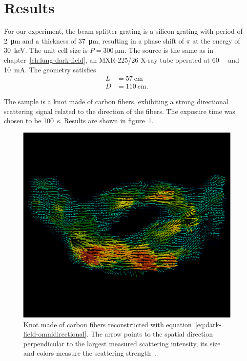 \section{Results}
For our experiment, the beam splitter grating is a silicon grating with
period of \SI{2}{\micro\meter} and a thickness of \SI{37}{\micro\meter},
resulting in a phase shift of $\pi$ at the energy of \SI{30}{\kilo\eV}. The
unit cell size is $P = \SI{300}{\micro\meter}$. The
source is the same as in chapter~\ref{ch:lung-dark-field}, an MXR-225/26
X-ray tube operated at \SI{60}{\kilo\voltpeak} and \SI{10}{\milli\ampere}.
The geometry satisfies
\begin{align*}
    L &= \SI{57}{\centi\meter}\\
    D &= \SI{110}{\centi\meter}.
\end{align*}

The sample is a knot made of carbon fibers, exhibiting a strong
directional scattering signal related to the direction of the fibers. The exposure
time was chosen to be \SI{100}{\second}.
Results are shown in figure~\ref{fig:knot-reconstruction}.

\begin{figure}[htb]
    \centering
    \includegraphics[width=\textwidth]{gfx/omnidirectional/filtered.png}
    \caption{Knot made of carbon fibers reconstructed with
        equation~\eqref{eq:dark-field-omnidirectional}. The arrow points to
    the spatial direction perpendicular to the largest measured scattering
intensity, its size and colors measure the scattering
strength~\parencite{kagias2018omnidir}.}
    \label{fig:knot-reconstruction}
\end{figure}

